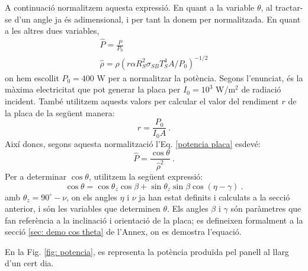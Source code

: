 \documentclass[11pt]{article}
\begin{document}
A continuació normalitzem aquesta expressió. En quant a la variable $\theta$, al tractar-se d'un angle ja és adimensional, i per tant la donem per normalitzada. En quant a les altres dues variables,
\begin{align}
    \hat{P}=\frac{P}{P_0} \label{P normalizada} \\
    \hat{\rho}= \rho \left( r \alpha R_S^2\sigma_{SB}T_S^4A/P_0 \right)^{-1/2} \label{rho normalizada}
\end{align}
on hem escollit $P_0=400$ W per a normalitzar la potència. Segons l'enunciat, és la màxima electricitat que pot generar la placa per $I_0=10^3$ W/$\text{m}^2$ de radiació incident. També utilitzem aquests valors per calcular el valor del rendiment $r$ de la placa de la següent manera:
\begin{equation}
     r = \frac{P_0}{I_0A} \ .
\end{equation}
Així doncs, segons aquesta normalització l'Eq. \eqref{potencia placa} esdevé:
\begin{equation}
    \hat{P} = \frac{\cos{\theta}}{\hat{\rho}^2} \ .
    \label{pot norm}
\end{equation}
Per a determinar $\cos{\theta}$, utilitzem la següent expressió:
\begin{equation}
    \cos \theta = \cos \theta_z \cos \beta + \sin \theta_z \sin \beta \cos (\eta - \gamma) \ .
    \label{cos theta}
\end{equation}
amb $\theta_z = 90^{\circ}-\nu$, on els angles $\eta$ i $\nu$ ja han estat definits i calculats a la secció anterior, i són les variables que determinen $\theta$. Els angles $\beta$ i $\gamma$ són paràmetres que fan referència a la inclinació i orientació de la placa; es defineixen formalment a la secció \ref{sec: demo cos theta} de l'Annex, on es demostra l'equació.

En la Fig. \ref{fig: potencia}, es representa la potència produïda pel panell al llarg d'un cert dia.
\end{document}

